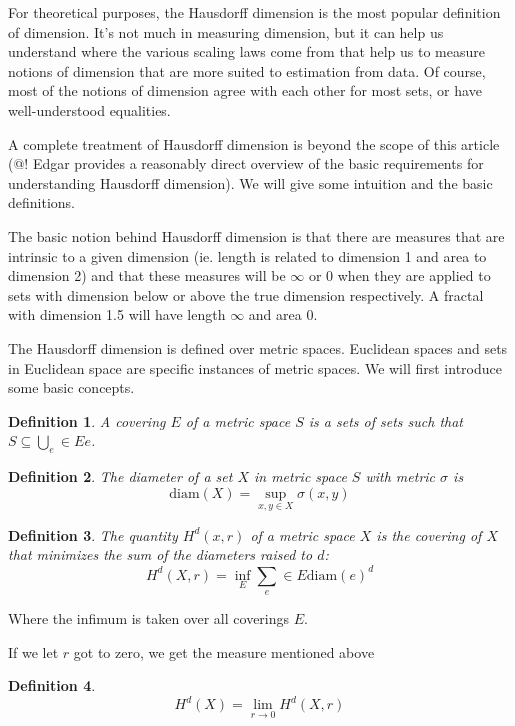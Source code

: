 \documentclass[10pt]{article}
\newtheorem{dfn}{Definition}
\begin{document}
For theoretical purposes, the Hausdorff dimension is the most popular definition of dimension. It's not much in measuring dimension, but it can help us understand where the various scaling laws come from that help us to measure notions of dimension that are more suited to estimation from data. Of course, most of the notions of dimension agree with each other for most sets, or have well-understood equalities.

A complete treatment of Hausdorff dimension is beyond the scope of this article (@! Edgar provides a reasonably direct overview of the basic requirements for understanding Hausdorff dimension). We will give some intuition and the basic definitions. 

The basic notion behind Hausdorff dimension is that there are measures that are intrinsic to a given dimension (ie. length is related to dimension 1 and area to dimension 2) and that these measures will be $\infty$ or $0$ when they are applied to sets with dimension below or above the true dimension respectively. A fractal with dimension 1.5 will have length $\infty$ and area $0$.

The Hausdorff dimension is defined over metric spaces. Euclidean spaces and sets in Euclidean space are specific instances of metric spaces. We will first introduce some basic concepts.

\begin{dfn}
A covering $E$ of a metric space $S$ is a sets of sets such that $S \subseteq\bigcup_e \in E e$. 
\end{dfn}

\begin{dfn}
The diameter of a set $X$ in metric space $S$ with metric $\sigma$ is
\[
\mbox{diam}(X) = \sup_{x, y \in X}\sigma(x, y)
\]
\end{dfn}

\begin{dfn}
The quantity $H^d(x, r)$ of a metric space $X$ is the covering of $X$ that minimizes the sum of the diameters raised to $d$:
\[
H^d(X, r) = \inf_E \sum_e \in E \mbox{diam}(e)^d
\]  
\end{dfn}

Where the infimum is taken over all coverings $E$.

If we let $r$ got to zero, we get the measure mentioned above

\begin{dfn}
\[
H^d(X) = \lim_{r \rightarrow 0} H^d(X, r)
\] 
\end{dfn}
\end{document}
